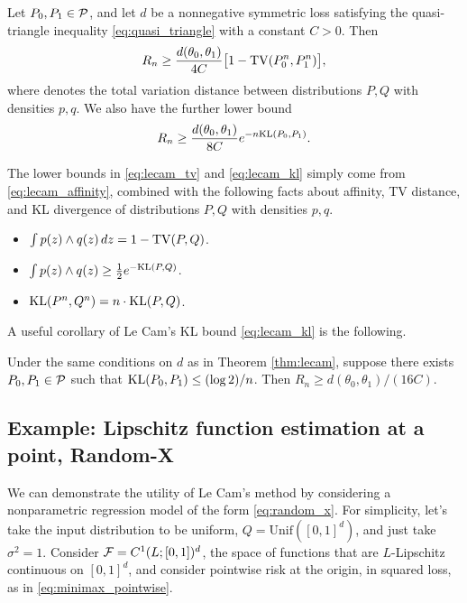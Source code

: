 \documentclass{article}
\begin{document}
\begin{theorem}
\label{thm:lecam}
Let $P_0,P_1 \in \mathcal{P}$, and let $d$ be a nonnegative symmetric loss satisfying
the quasi-triangle inequality \eqref{eq:quasi_triangle} with a constant
$C>0$. Then 
\begin{equation}
\label{eq:lecam_tv}
R_n \geq \frac{d(\theta_0, \theta_1)}{4C} \big[ 1 - \mathrm{TV}(P_0^n, P_1^n) \big], 
\end{equation}
where  denotes the
total variation distance between distributions $P,Q$ with densities
$p,q$. We also have the further lower bound
\begin{equation}
\label{eq:lecam_kl}
R_n \geq \frac{d(\theta_0, \theta_1)}{8C} e^{-n \mathrm{KL}(P_0, P_1)}. 
\end{equation}
\end{theorem}

The lower bounds in \eqref{eq:lecam_tv} and \eqref{eq:lecam_kl} simply come from
\eqref{eq:lecam_affinity}, combined with the following facts about affinity, TV
distance, and KL divergence of distributions $P,Q$ with densities $p,q$.   

\begin{itemize}
\item $\int p(z) \wedge q(z) \, dz = 1 - \mathrm{TV}(P,Q)$.
\item $\int p(z) \wedge q(z) \geq \frac{1}{2} e^{-\mathrm{KL}(P,Q)}$.
\item $\mathrm{KL}(P^n,Q^n) = n \cdot \mathrm{KL}(P,Q)$.
\end{itemize}

A useful corollary of Le Cam's KL bound \eqref{eq:lecam_kl} is the following. 

\begin{corollary}
\label{cor:lecam}
Under the same conditions on $d$ as in Theorem \ref{thm:lecam}, suppose there 
exists $P_0,P_1 \in \mathcal{P}$ such that $\mathrm{KL}(P_0,P_1) \leq (\log 2)/n$. Then $R_n
\geq d(\theta_0, \theta_1)/(16 C)$.  
\end{corollary}

\subsection{Example: Lipschitz function estimation at a point, Random-X} 
\label{sec:lipschitz_pointwise}

We can demonstrate the utility of Le Cam's method by considering a nonparametric
regression model of the form \eqref{eq:random_x}. For simplicity, let's take the
input distribution to be uniform, $Q = \mathrm{Unif}([0,1]^d)$, and just take
$\sigma^2 = 1$. Consider $\mathcal{F} = C^1(L; [0,1])^d$, the space of functions that
are $L$-Lipschitz continuous on $[0,1]^d$, and consider pointwise risk at the
origin, in squared loss, as in \eqref{eq:minimax_pointwise}.     
\end{document}
